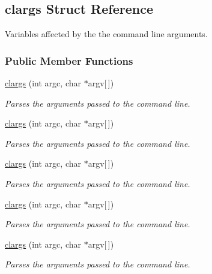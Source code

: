 \hypertarget{structclargs}{
\subsection{clargs Struct Reference}
\label{structclargs}
}


Variables affected by the the command line arguments.  


\subsubsection*{Public Member Functions}
\begin{DoxyCompactItemize}
\item 
\hyperlink{structclargs_ac5a54b5b965289a3ad0766317ae630dd}{clargs} (int argc, char $\ast$argv\mbox{[}$\,$\mbox{]})
\begin{DoxyCompactList}\small\item\em Parses the arguments passed to the command line. \item\end{DoxyCompactList}\item 
\hyperlink{structclargs_ac5a54b5b965289a3ad0766317ae630dd}{clargs} (int argc, char $\ast$argv\mbox{[}$\,$\mbox{]})
\begin{DoxyCompactList}\small\item\em Parses the arguments passed to the command line. \item\end{DoxyCompactList}\item 
\hyperlink{structclargs_ac5a54b5b965289a3ad0766317ae630dd}{clargs} (int argc, char $\ast$argv\mbox{[}$\,$\mbox{]})
\begin{DoxyCompactList}\small\item\em Parses the arguments passed to the command line. \item\end{DoxyCompactList}\item 
\hyperlink{structclargs_ac5a54b5b965289a3ad0766317ae630dd}{clargs} (int argc, char $\ast$argv\mbox{[}$\,$\mbox{]})
\begin{DoxyCompactList}\small\item\em Parses the arguments passed to the command line. \item\end{DoxyCompactList}\item 
\hyperlink{structclargs_ac5a54b5b965289a3ad0766317ae630dd}{clargs} (int argc, char $\ast$argv\mbox{[}$\,$\mbox{]})
\begin{DoxyCompactList}\small\item\em Parses the arguments passed to the command line. \item\end{DoxyCompactList}\item 

\end{DoxyCompactItemize}
